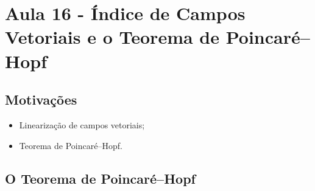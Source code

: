 \documentclass[../differential_topology.tex]{subfiles}
\begin{document}
\section{Aula 16 - Índice de Campos Vetoriais e o Teorema de Poincaré--Hopf}
\subsection{Motivações}
\begin{itemize}
	\item Linearização de campos vetoriais;
	\item Teorema de Poincaré--Hopf.
\end{itemize}
\subsection{O Teorema de Poincaré--Hopf}
\end{document}
